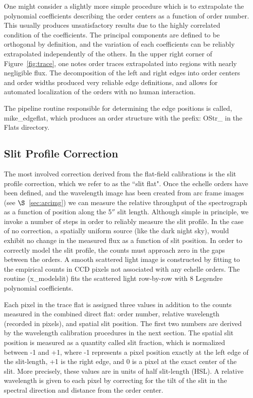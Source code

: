 \documentclass[12pt,preprint]{aastex}
\begin{document}
One might consider a slightly more simple procedure which is to 
extrapolate the polynomial coefficients describing the order centers 
as a function of order number.  
This usually produces unsatisfactory results due to the highly
correlated condition of the coefficients.  The principal components are
defined to be orthogonal by definition, and the variation of each 
coefficients can be reliably extrapolated independently of the others.
In the upper right corner of Figure~\ref{fig:trace}, one notes 
order traces extrapolated into regions with nearly negligible flux.
The decomposition of the left and right edges into order centers and
order widths produced very reliable edge definitions, and 
allows for automated localization of the 
orders with no human interaction.

The pipeline routine responsible for determining the edge positions
is called, mike\_edgeflat, which produces an order structure with the
prefix:  OStr\_ in the Flats directory.

\subsection{Slit Profile Correction}
\label{sec:slitprof}

The most involved correction derived from the
flat-field calibrations is the slit profile correction, which we refer
to as the ``slit flat".  Once the echelle orders have been defined, and the
wavelength image has been created from arc frame images 
(see $\S$~\ref{sec:arcimg})
we can measure the relative throughput of the spectrograph as a function of
position along the 5$''$ slit length.  
Although simple in principle, we invoke a number
of steps in order to reliably measure the slit profile.  In the case of no
correction, a spatially uniform source (like the dark night sky), would
exhibit no change in the measured flux as a function of slit position.
In order to correctly model the slit profile, the counts must approach zero
in the gaps between the orders.  A smooth scattered light image is constructed 
by fitting to the empirical counts in CCD pixels not associated with any
echelle orders.  The routine (x\_modelslit)
fits the scattered light row-by-row with 
8 Legendre polynomial coefficients. 

Each pixel in the trace flat is assigned three values in addition to the counts
measured in the combined direct flat:  order number, relative wavelength
(recorded in pixels), and spatial slit position.  
The first two numbers are derived by the wavelength calibration
procedures in the next section.
The spatial slit position is measured as a quantity
called slit fraction, which is normalized between -1 and +1, 
where -1 represents a pixel position exactly at the left edge 
of the slit-length, 
+1 is the right edge, and 0 is a pixel at the exact center of the slit.
More precisely, these values are in units of half slit-length (HSL).
A relative wavelength is given to each pixel by correcting for the tilt
of the slit in the spectral direction and distance from the order center.
\end{document}
